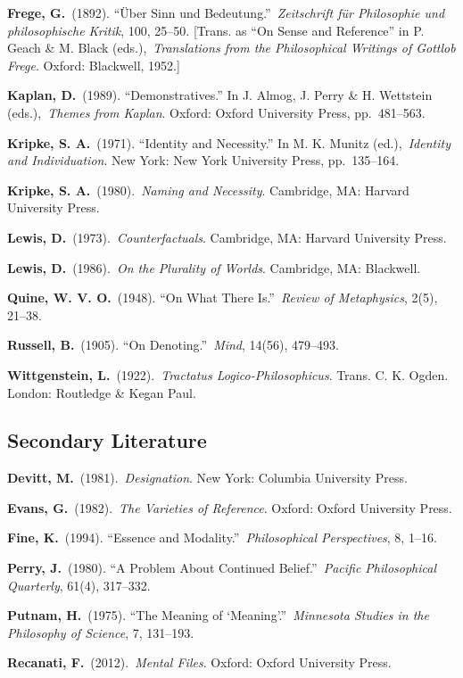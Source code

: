 \documentclass[12pt,a4paper]{article}
\begin{document}
\textbf{Frege, G.}~(1892). ``Über Sinn und Bedeutung.''~\emph{Zeitschrift für Philosophie und philosophische Kritik}, 100, 25--50. {[}Trans. as ``On Sense and Reference'' in P. Geach \& M. Black (eds.),~\emph{Translations from the Philosophical Writings of Gottlob Frege}. Oxford: Blackwell, 1952.{]}

\textbf{Kaplan, D.}~(1989). ``Demonstratives.'' In J. Almog, J. Perry \& H. Wettstein (eds.),~\emph{Themes from Kaplan}. Oxford: Oxford University Press, pp.~481--563.

\textbf{Kripke, S. A.}~(1971). ``Identity and Necessity.'' In M. K. Munitz (ed.),~\emph{Identity and Individuation}. New York: New York University Press, pp.~135--164.

\textbf{Kripke, S. A.}~(1980).~\emph{Naming and Necessity}. Cambridge, MA: Harvard University Press.

\textbf{Lewis, D.}~(1973).~\emph{Counterfactuals}. Cambridge, MA: Harvard University Press.

\textbf{Lewis, D.}~(1986).~\emph{On the Plurality of Worlds}. Cambridge, MA: Blackwell.

\textbf{Quine, W. V. O.}~(1948). ``On What There Is.''~\emph{Review of Metaphysics}, 2(5), 21--38.

\textbf{Russell, B.}~(1905). ``On Denoting.''~\emph{Mind}, 14(56), 479--493.

\textbf{Wittgenstein, L.}~(1922).~\emph{Tractatus Logico-Philosophicus}. Trans. C. K. Ogden. London: Routledge \& Kegan Paul.

\subsection{Secondary Literature}\label{secondary-literature}

\textbf{Devitt, M.}~(1981).~\emph{Designation}. New York: Columbia University Press.

\textbf{Evans, G.}~(1982).~\emph{The Varieties of Reference}. Oxford: Oxford University Press.

\textbf{Fine, K.}~(1994). ``Essence and Modality.''~\emph{Philosophical Perspectives}, 8, 1--16.

\textbf{Perry, J.}~(1980). ``A Problem About Continued Belief.''~\emph{Pacific Philosophical Quarterly}, 61(4), 317--332.

\textbf{Putnam, H.}~(1975). ``The Meaning of `Meaning'.''~\emph{Minnesota Studies in the Philosophy of Science}, 7, 131--193.

\textbf{Recanati, F.}~(2012).~\emph{Mental Files}. Oxford: Oxford University Press.
\end{document}
